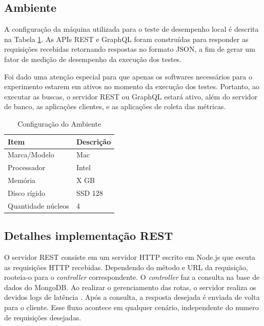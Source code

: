 \subsection{Ambiente}

A configuração da máquina utilizada para o teste de desempenho local é descrita na Tabela \ref{tab:host}. As APIs REST e GraphQL foram construídas para responder as requisições recebidas retornando respostas no formato JSON, a fim de gerar um fator de medição de desempenho da execução dos testes.

Foi dado uma atenção especial para que apenas os softwares necessários para o experimento estarem em ativos no momento da execução dos testes. Portanto, ao executar as buscas, o servidor REST ou GraphQL estará ativo, além do servidor de banco, as aplicações clientes, e as aplicações de coleta das métricas.

\begin{table}
    \centering
    \begin{tabular}{| l | l |}
        \hline
        \textbf{Item} & \textbf{Descrição} \\ \hline
        Marca/Modelo & Mac \\ \hline
        Processador & Intel \\ \hline
        Memória &  X GB  \\ \hline
        Disco rígido & SSD 128  \\ \hline
        Quantidade núcleos & 4  \\ \hline
    \end{tabular}
    \caption{Configuração do Ambiente} \label{tab:host}
\end{table}

\subsection{Detalhes implementação REST}

O servidor REST consiste em um servidor HTTP escrito em Node.js que escuta as requisições HTTP recebidas. Dependendo do método e URL da requisição, rooteia-o para o \textit{controller} correspondente. O \textit{controller} faz a consulta na base de dados do MongoDB. Ao realizar o gerenciamento das rotas, o servidor realiza os devidos logs de latência . Após a consulta, a resposta desejada é enviada de volta para o cliente. Esse fluxo acontece em qualquer cenário, independente do numero de requisições desejadas.

